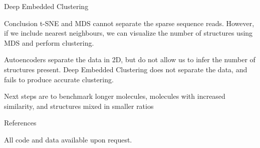 \documentclass[final]{beamer}
\newlength{\onecolwid}
\begin{document}
\begin{frame}[t]
\begin{columns}[t]
\begin{column}{\onecolwid}
\begin{block}{Deep Embedded Clustering }
\end{block}

\begin{block}{Conclusion}
t-SNE and MDS cannot separate the sparse sequence reads. However, if we include nearest neighbours, we can visualize the number of structures using MDS and perform clustering.

Autoencoders separate the data in 2D, but do not allow us to infer the number of structures present. Deep Embedded Clustering does not separate the data, and fails to produce accurate clustering.

Next steps are to benchmark longer molecules, molecules with increased similarity, and structures mixed in smaller ratios
\end{block}



\begin{block}{References}

\nocite{*} %
\small{
\vspace{0.75in}}

All code and data available upon request.
\end{block}


\end{column} %

\end{columns} %

\end{frame} %
\end{document}
